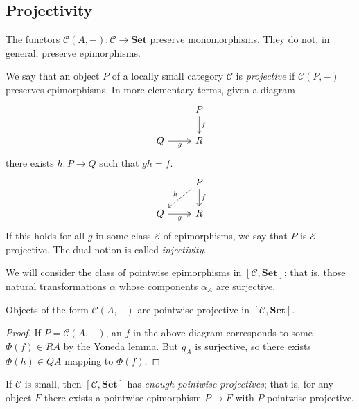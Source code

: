 \subsection{Projectivity}
The functors \( \mathcal C(A, -) : \mathcal C \to \mathbf{Set} \) preserve monomorphisms.
They do not, in general, preserve epimorphisms.
\begin{definition}
    We say that an object \( P \) of a locally small category \( \mathcal C \) is \emph{projective} if \( \mathcal C(P, -) \) preserves epimorphisms.
    In more elementary terms, given a diagram
\[\begin{tikzcd}
	& P \\
	Q & R
	\arrow["f", from=1-2, to=2-2]
	\arrow["g"', two heads, from=2-1, to=2-2]
\end{tikzcd}\]
    there exists \( h : P \to Q \) such that \( gh = f \).
\[\begin{tikzcd}
	& P \\
	Q & R
	\arrow["f", from=1-2, to=2-2]
	\arrow["g"', two heads, from=2-1, to=2-2]
	\arrow["h"', dashed, from=1-2, to=2-1]
\end{tikzcd}\]
    If this holds for all \( g \) in some class \( \mathcal E \) of epimorphisms, we say that \( P \) is \( \mathcal E \)-projective.
    The dual notion is called \emph{injectivity}.
\end{definition}
We will consider the class of pointwise epimorphisms in \( [\mathcal C, \mathbf{Set}] \); that is, those natural transformations \( \alpha \) whose components \( \alpha_A \) are surjective.
\begin{corollary}
    Objects of the form \( \mathcal C(A, -) \) are pointwise projective in \( [\mathcal C, \mathbf{Set}] \).
\end{corollary}
\begin{proof}
    If \( P = \mathcal C(A, -) \), an \( f \) in the above diagram corresponds to some \( \Phi(f) \in RA \) by the Yoneda lemma.
    But \( g_A \) is surjective, so there exists \( \Phi(h) \in QA \) mapping to \( \Phi(f) \).
\end{proof}
\begin{proposition}
    If \( \mathcal C \) is small, then \( [\mathcal C, \mathbf{Set}] \) has \emph{enough pointwise projectives}; that is, for any object \( F \) there exists a pointwise epimorphism \( P \to F \) with \( P \) pointwise projective.
\end{proposition}
